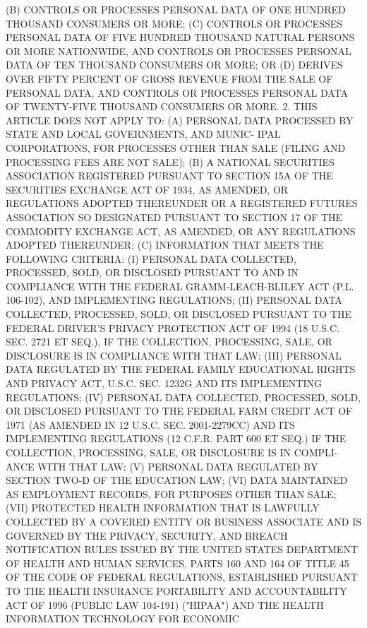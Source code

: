   (B)  CONTROLS  OR  PROCESSES  PERSONAL  DATA  OF  ONE HUNDRED THOUSAND
 CONSUMERS OR MORE;
   (C)  CONTROLS  OR  PROCESSES  PERSONAL  DATA  OF FIVE HUNDRED THOUSAND
 NATURAL PERSONS OR MORE NATIONWIDE, AND CONTROLS OR  PROCESSES  PERSONAL
 DATA OF TEN THOUSAND CONSUMERS OR MORE; OR
   (D)  DERIVES  OVER  FIFTY  PERCENT  OF  GROSS REVENUE FROM THE SALE OF
 PERSONAL DATA, AND CONTROLS OR PROCESSES PERSONAL  DATA  OF  TWENTY-FIVE
 THOUSAND CONSUMERS OR MORE.
   2. THIS ARTICLE DOES NOT APPLY TO:
   (A) PERSONAL DATA PROCESSED BY STATE AND LOCAL GOVERNMENTS, AND MUNIC-
 IPAL  CORPORATIONS, FOR PROCESSES OTHER THAN SALE (FILING AND PROCESSING
 FEES ARE NOT SALE);
   (B) A NATIONAL SECURITIES ASSOCIATION REGISTERED PURSUANT  TO  SECTION
 15A  OF  THE SECURITIES EXCHANGE ACT OF 1934, AS AMENDED, OR REGULATIONS
 ADOPTED THEREUNDER OR A REGISTERED  FUTURES  ASSOCIATION  SO  DESIGNATED
 PURSUANT TO SECTION 17 OF THE COMMODITY EXCHANGE ACT, AS AMENDED, OR ANY
 REGULATIONS ADOPTED THEREUNDER;
   (C) INFORMATION THAT MEETS THE FOLLOWING CRITERIA:
   (I) PERSONAL DATA COLLECTED, PROCESSED, SOLD, OR DISCLOSED PURSUANT TO
 AND   IN  COMPLIANCE  WITH  THE  FEDERAL  GRAMM-LEACH-BLILEY  ACT  (P.L.
 106-102), AND IMPLEMENTING REGULATIONS;
   (II) PERSONAL DATA COLLECTED, PROCESSED, SOLD, OR  DISCLOSED  PURSUANT
 TO  THE  FEDERAL DRIVER'S PRIVACY PROTECTION ACT OF 1994 (18 U.S.C. SEC.
 2721 ET SEQ.), IF THE COLLECTION, PROCESSING, SALE, OR DISCLOSURE IS  IN
 COMPLIANCE WITH THAT LAW;
   (III) PERSONAL DATA REGULATED BY THE FEDERAL FAMILY EDUCATIONAL RIGHTS
 AND PRIVACY ACT, U.S.C. SEC. 1232G AND ITS IMPLEMENTING REGULATIONS;
   (IV)  PERSONAL  DATA COLLECTED, PROCESSED, SOLD, OR DISCLOSED PURSUANT
 TO THE FEDERAL FARM CREDIT ACT OF 1971 (AS AMENDED  IN  12  U.S.C.  SEC.
 2001-2279CC)  AND  ITS  IMPLEMENTING  REGULATIONS (12 C.F.R. PART 600 ET
 SEQ.) IF THE COLLECTION, PROCESSING, SALE, OR DISCLOSURE IS  IN  COMPLI-
 ANCE WITH THAT LAW;
   (V) PERSONAL DATA REGULATED BY SECTION TWO-D OF THE EDUCATION LAW;
   (VI)  DATA  MAINTAINED  AS EMPLOYMENT RECORDS, FOR PURPOSES OTHER THAN
 SALE;
   (VII) PROTECTED HEALTH INFORMATION THAT IS  LAWFULLY  COLLECTED  BY  A
 COVERED  ENTITY  OR  BUSINESS  ASSOCIATE AND IS GOVERNED BY THE PRIVACY,
 SECURITY, AND BREACH NOTIFICATION RULES  ISSUED  BY  THE  UNITED  STATES
 DEPARTMENT  OF  HEALTH AND HUMAN SERVICES, PARTS 160 AND 164 OF TITLE 45
 OF THE CODE OF FEDERAL REGULATIONS, ESTABLISHED PURSUANT TO  THE  HEALTH
 INSURANCE  PORTABILITY  AND  ACCOUNTABILITY  ACT  OF  1996  (PUBLIC  LAW
 104-191) ("HIPAA") AND THE HEALTH INFORMATION  TECHNOLOGY  FOR  ECONOMIC
